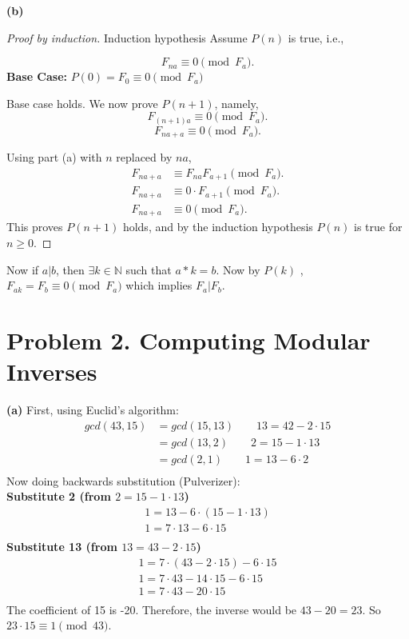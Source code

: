 \documentclass{article}
\begin{document}
\vspace{\baselineskip}
\noindent\textbf{(b)}

\begin{proof}[Proof by induction]
Induction hypothesis Assume \(P(n)\) is true, i.e.,

\[F_{na} \equiv 0 \pmod{F_a}.\]
\textbf{Base Case:} $P(0)= F_0 \equiv 0 \pmod{F_a}$

Base case holds. We now prove $P(n+1)$, namely,
\[F_{(n+1)a} \equiv 0 \pmod{F_a}.\]
\[F_{na+a} \equiv 0 \pmod{F_a}.\]

Using part (a) with $n$ replaced by $na$,
\[
\begin{aligned}
F_{na+a} &\equiv F_{na}F_{a+1} \pmod{F_a}. \\[6pt]
F_{na+a} &\equiv 0\cdot F_{a+1} \pmod{F_a}. \\[6pt]
F_{na+a} &\equiv 0 \pmod{F_a}.
\end{aligned}
\]
This proves $P(n+1)$ holds, and by the induction hypothesis $P(n)$ is true for $n \geq 0$.
\end{proof}
Now if $a \vert b$, then $\exists k \in \mathbb{N}$ such that $a * k = b$. Now by $P(k)$ , $F_{ak} = F_b \equiv 0 \pmod{F_a}$ which implies $F_a \vert F_b$.

\section*{Problem 2. Computing Modular Inverses}

\textbf{(a)}
First, using Euclid's algorithm:
\[
\begin{aligned}
gcd(43,15) &= gcd(15,13) \qquad 13 = 42 - 2 \cdot 15\\
&= gcd(13,2) \qquad 2 = 15 - 1 \cdot 13\\
&= gcd(2,1) \qquad 1 = 13 - 6 \cdot 2\\
\end{aligned}
\]
Now doing backwards substitution (Pulverizer):\\
\textbf{Substitute 2 (from $2 = 15 - 1 \cdot 13$)}
\[
\begin{aligned}
1 = 13 - 6 \cdot (15 - 1 \cdot 13)\\
1 = 7 \cdot 13 - 6 \cdot 15\\
\end{aligned}
\]
\textbf{Substitute 13 (from $13 = 43 - 2 \cdot 15$)}
\[
\begin{aligned}
1 = 7 \cdot (43 - 2 \cdot 15) - 6 \cdot 15\\
1 = 7 \cdot 43 - 14 \cdot 15 - 6 \cdot 15\\
1 = 7 \cdot 43 - 20 \cdot 15\\
\end{aligned}
\]
The coefficient of 15 is -20. Therefore, the inverse would be $43 - 20 = 23$. So $23 \cdot 15 \equiv 1 \pmod{43}$.
\end{document}
